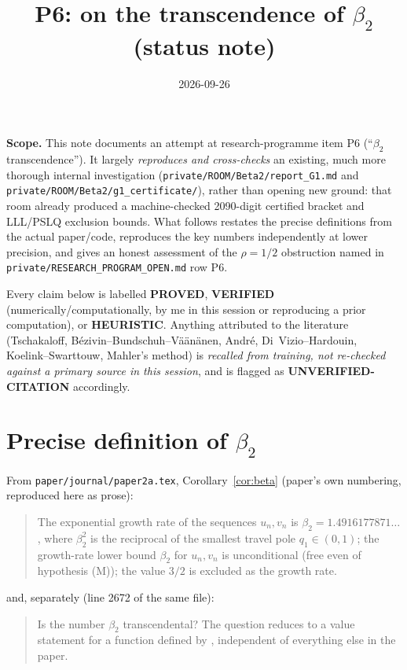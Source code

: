 \documentclass[11pt]{article}
\title{P6: on the transcendence of $\beta_2$ (status note)}
\author{}
\date{2026-09-26}
\begin{document}
\maketitle

\noindent\textbf{Scope.} This note documents an attempt at research-programme item P6
(``$\beta_2$ transcendence''). It largely \emph{reproduces and cross-checks} an existing,
much more thorough internal investigation (\texttt{private/ROOM/Beta2/report\_G1.md} and
\texttt{private/ROOM/Beta2/g1\_certificate/}), rather than opening new ground: that room
already produced a machine-checked 2090-digit certified bracket and LLL/PSLQ exclusion
bounds. What follows restates the precise definitions from the actual paper/code, reproduces
the key numbers independently at lower precision, and gives an honest assessment of the
$\rho=1/2$ obstruction named in \texttt{private/RESEARCH\_PROGRAM\_OPEN.md} row P6.

Every claim below is labelled \textbf{PROVED}, \textbf{VERIFIED} (numerically/computationally,
by me in this session or reproducing a prior computation), or \textbf{HEURISTIC}. Anything
attributed to the literature (Tschakaloff, Bézivin--Bundschuh--Väänänen, André, Di~Vizio--Hardouin,
Koelink--Swarttouw, Mahler's method) is \emph{recalled from training, not re-checked against a
primary source in this session}, and is flagged as \textbf{UNVERIFIED-CITATION} accordingly.

\section{Precise definition of $\beta_2$}

From \texttt{paper/journal/paper2a.tex}, Corollary~\ref{cor:beta} (paper's own numbering,
reproduced here as prose):
\begin{quote}
The exponential growth rate of the sequences $u_n,v_n$ is
$\beta_2 = 1.4916177871\ldots$, where $\beta_2^{2}$ is the reciprocal of the smallest travel
pole $q_1\in(0,1)$; the growth-rate lower bound $\beta_2$ for $u_n,v_n$ is unconditional (free
even of hypothesis (M)); the value $3/2$ is excluded as the growth rate.
\end{quote}
and, separately (line 2672 of the same file):
\begin{quote}
Is the number $\beta_2$ transcendental? The question reduces to a value statement for a
function defined by \cite[Appendix app:beta2]{Bonfioli2026bB}, independent of everything else
in the paper.
\end{quote}
\end{document}
